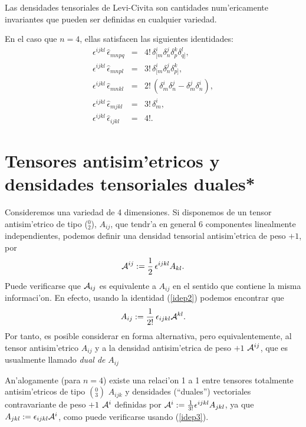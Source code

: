  Las densidades tensoriales de Levi-Civita son cantidades num'ericamente
 invariantes que pueden ser definidas en cualquier variedad.


 En el caso que $n=4$, ellas satisfacen las siguientes identidades:
 \begin{eqnarray}
 \epsilon^{ijkl}\, \hat{\epsilon}_{mnpq}&=&4!\, \delta^i_{[m}\delta ^j_n
 \delta^k_p \delta^l_{q]}, \\
 \epsilon^{ijkl}\, \hat{\epsilon}_{mnpl}&=&3!\, \delta^i_{[m}\delta ^j_n
 \delta^k_{p]} , \\
 \epsilon^{ijkl}\, \hat{\epsilon}_{mnkl}&=&2!\, \left( \delta^i_m\delta ^j_n -
 \delta^j_m \delta^i_n\right), \label{idep2} \\
 \epsilon^{ijkl}\, \hat{\epsilon}_{mjkl}&=&3!\, \delta^i_m, \label{idep3}\\
 \epsilon^{ijkl}\, \hat{\epsilon}_{ijkl}&=&4! .
 \end{eqnarray}

 \section{Tensores antisim'etricos y densidades tensoriales duales*}
 Consideremos una variedad de 4 dimensiones. Si disponemos de un tensor
 antisim'etrico de tipo ($_2^0$), $A_{ij}$, que tendr'a en general 6
 componentes linealmente independientes, podemos definir una densidad tensorial
 antisim'etrica de peso $+1$, por
 \begin{equation}
 {\cal A}^{ij}:=\frac{1}2\,\epsilon^{ijkl}A_{kl} .\label{den13}
 \end{equation}
 Puede verificarse que ${\cal A}_{ij}$ es equivalente a $A_{ij}$ en el sentido
 que contiene la misma informaci'on. En efecto, usando la identidad
 (\ref{idep2}) podemos encontrar que
 \begin{equation}
 A_{ij} :=\frac{1}{2!}\,\epsilon_{ijkl}{\cal A}^{kl}.
 \end{equation}
 Por tanto, es posible considerar en forma alternativa, pero equivalentemente,
 al tensor antisim'etrico $A_{ij}$ y a la densidad antisim'etrica de peso
 $+1$ ${\cal A}^{ij}$, que es usualmente llamado \textit{dual de} $A_{ij}$

 An'alogamente (para $n=4$) existe una relaci'on 1 a 1 entre tensores
 totalmente antisim'etricos de tipo $(^0_3)$ $A_{ijk}$ y densidades
 (``duales'') vectoriales
 contravariante de peso $+1$ ${\cal A}^i$ definidas por ${\cal
 A}^i:=\frac{1}{3!}\epsilon^{ijkl}A_{jkl}$, ya que
 $A_{jkl}:=\epsilon_{ijkl}{\cal A}^i$, como puede verificarse usando
 (\ref{idep3}).

